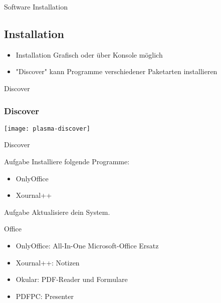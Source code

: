 \begin{frame}{Software Installation}
    \subsection{Installation}\label{subsec:installation}

    \begin{itemize}
        \item Installation Grafisch oder über Konsole möglich\pause
        \item "Discover" kann Programme verschiedener Paketarten installieren
    \end{itemize}

\end{frame}

\begin{frame}{Discover}
    \subsubsection{Discover}\label{subsubsec:discover}

    \texttt{[image: plasma-discover]}
\end{frame}

\begin{frame}{Discover}

    \vspace{0.5cm}
    \begin{alertblock}{Aufgabe}
        Installiere folgende Programme:
        \begin{itemize}
            \item OnlyOffice
            \item Xournal++
        \end{itemize}
    \end{alertblock}
    \pause

    \vspace{0.5cm}
    \begin{alertblock}{Aufgabe}
        Aktualisiere dein System.
    \end{alertblock}

\end{frame}

\begin{frame}{Office}

    \begin{itemize}
        \item OnlyOffice: All-In-One Microsoft-Office Ersatz\pause
        \item Xournal++: Notizen\pause
        \item Okular: PDF-Reader und Formulare\pause
        \item PDFPC: Presenter
    \end{itemize}

\end{frame}

